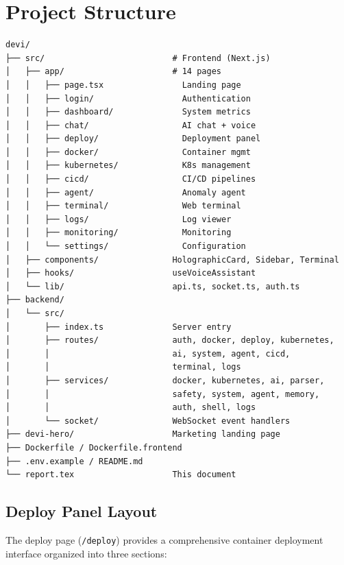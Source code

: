 \documentclass[12pt,a4paper]{report}
\begin{document}
\chapter{Project Structure}

\begin{lstlisting}[basicstyle=\ttfamily\scriptsize, xleftmargin=0.5em, xrightmargin=0.5em]
devi/
├── src/                          # Frontend (Next.js)
│   ├── app/                      # 14 pages
│   │   ├── page.tsx                Landing page
│   │   ├── login/                  Authentication
│   │   ├── dashboard/              System metrics
│   │   ├── chat/                   AI chat + voice
│   │   ├── deploy/                 Deployment panel
│   │   ├── docker/                 Container mgmt
│   │   ├── kubernetes/             K8s management
│   │   ├── cicd/                   CI/CD pipelines
│   │   ├── agent/                  Anomaly agent
│   │   ├── terminal/               Web terminal
│   │   ├── logs/                   Log viewer
│   │   ├── monitoring/             Monitoring
│   │   └── settings/               Configuration
│   ├── components/               HolographicCard, Sidebar, Terminal
│   ├── hooks/                    useVoiceAssistant
│   └── lib/                      api.ts, socket.ts, auth.ts
├── backend/
│   └── src/
│       ├── index.ts              Server entry
│       ├── routes/               auth, docker, deploy, kubernetes,
│       │                         ai, system, agent, cicd,
│       │                         terminal, logs
│       ├── services/             docker, kubernetes, ai, parser,
│       │                         safety, system, agent, memory,
│       │                         auth, shell, logs
│       └── socket/               WebSocket event handlers
├── devi-hero/                    Marketing landing page
├── Dockerfile / Dockerfile.frontend
├── .env.example / README.md
└── report.tex                    This document
\end{lstlisting}

\section{Deploy Panel Layout}
The deploy page (\texttt{/deploy}) provides a comprehensive container deployment interface organized into three sections:
\end{document}

